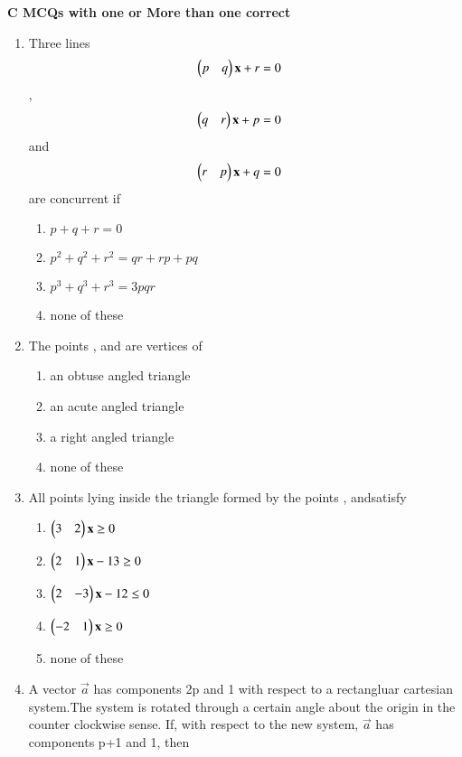 {\Large \textbf{C MCQs with one or More than one correct}}
\begin{enumerate}
    \item Three lines \begin{align}\begin{pmatrix}p & q\end{pmatrix} \mathbf {x} + r &= 0\end{align}, \begin{align}\begin{pmatrix}q & r\end{pmatrix} \mathbf {x} + p &= 0\end{align} and \begin{align}\begin{pmatrix}r & p\end{pmatrix} \mathbf {x} + q &= 0\end{align} are concurrent if
    \begin{enumerate}
     \item  $p+q+r=0$
     \item  $p^2+q^2+r^2=qr+rp+pq$
     \item  $p^3+q^3+r^3=3pqr$
     \item  none of these
     \end{enumerate}
    \item The points , and  are vertices of 
    \begin{enumerate}
     \item  an obtuse angled triangle
     \item  an acute angled triangle
     \item  a right angled triangle
     \item  none of these
     \end{enumerate}
    \item All points lying inside the triangle formed by the points , andsatisfy
    \begin{enumerate}
     \item  $\begin{pmatrix}3 & 2\end{pmatrix} \mathbf {x} \geq 0$
     \item  $\begin{pmatrix}2 & 1\end{pmatrix} \mathbf {x}-13\geq 0$
     \item  $\begin{pmatrix}2 & -3\end{pmatrix} \mathbf {x}-12\leq 0$
     \item  $\begin{pmatrix}-2 & 1\end{pmatrix} \mathbf {x} \geq 0$
     \item none of these
     \end{enumerate}
    \item A vector $\vec a$ has components 2p and 1 with respect to a rectangluar cartesian system.The system is rotated through a certain angle about the origin in the counter clockwise sense. If, with respect to the new system,  $\vec a$ has components p+1 and 1, then

\end{enumerate}
